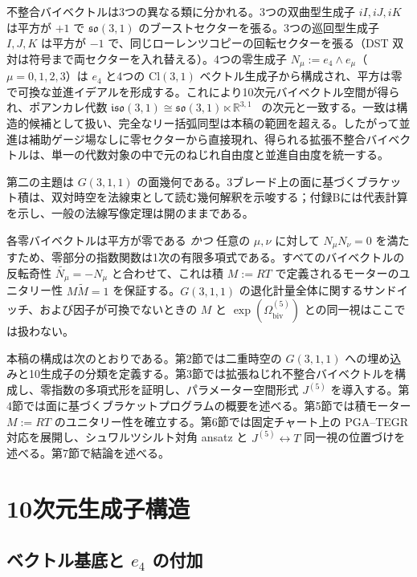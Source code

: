 \documentclass[dvipdfmx,11pt,a4paper]{article}
\theoremstyle{definition}
\theoremstyle{plain}
\theoremstyle{remark}
\begin{document}
不整合バイベクトルは3つの異なる類に分かれる。3つの双曲型生成子 $iI, iJ, iK$ は平方が $+1$ で $\mathfrak{so}(3,1)$ のブーストセクターを張る。3つの巡回型生成子 $I, J, K$ は平方が $-1$ で、同じローレンツコピーの回転セクターを張る（DST 双対は符号まで両セクターを入れ替える）。4つの零生成子 $N_{\mu} := e_{4}\wedge e_{\mu}$（$\mu=0,1,2,3$）は $e_{4}$ と4つの $\mathrm{Cl}(3,1)$ ベクトル生成子から構成され、平方は零で可換な並進イデアルを形成する。これにより10次元バイベクトル空間が得られ、ポアンカレ代数 $\mathfrak{iso}(3,1)\cong\mathfrak{so}(3,1)\ltimes\mathbb{R}^{3,1}$~\cite{Weinberg1995,Tung1985} の次元と一致する。一致は構造的候補として扱い、完全なリー括弧同型は本稿の範囲を超える。したがって並進は補助ゲージ場なしに零セクターから直接現れ、得られる拡張不整合バイベクトルは、単一の代数対象の中で元のねじれ自由度と並進自由度を統一する。

第二の主題は $G(3,1,1)$ の面幾何である。3ブレード上の面に基づくブラケット積は、双対時空を法線束として読む幾何解釈を示唆する；付録Bには代表計算を示し、一般の法線写像定理は開のままである。

各零バイベクトルは平方が零である \emph{かつ} 任意の $\mu,\nu$ に対して $N_{\mu}N_{\nu}=0$ を満たすため、零部分の指数関数は1次の有限多項式である。すべてのバイベクトルの反転奇性 $\widetilde{N_{\mu}}=-N_{\mu}$ と合わせて、これは積 $M:=RT$ で定義されるモーターのユニタリー性 $M\widetilde{M}=1$ を保証する。$G(3,1,1)$ の退化計量全体に関するサンドイッチ、および因子が可換でないときの $M$ と $\exp(\Omega_{\mathrm{biv}}^{(5)})$ との同一視はここでは扱わない。

本稿の構成は次のとおりである。第2節では二重時空の $G(3,1,1)$ への埋め込みと10生成子の分類を定義する。第3節では拡張ねじれ不整合バイベクトルを構成し、零指数の多項式形を証明し、パラメーター空間形式 $J^{(5)}$ を導入する。第4節では面に基づくブラケットプログラムの概要を述べる。第5節では積モーター $M:=RT$ のユニタリー性を確立する。第6節では固定チャート上の PGA--TEGR 対応を展開し、シュワルツシルト対角 ansatz と $J^{(5)}\leftrightarrow T$ 同一視の位置づけを述べる。第7節で結論を述べる。

\section{10次元生成子構造}

\subsection{ベクトル基底と $e_{4}$ の付加}
\end{document}
